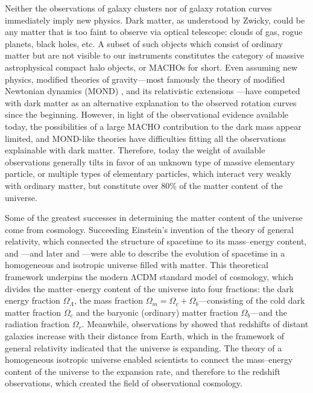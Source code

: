 \documentclass[b5paper, 10pt, twoside]{book}
\begin{document}
Neither the observations of galaxy clusters nor of galaxy rotation curves immediately imply new physics. Dark matter, as understood by Zwicky, could be any matter that is too faint to observe via optical telescope: clouds of gas, rogue planets, black holes, etc. A subset of such objects which consist of ordinary matter but are not visible to our instruments constitutes the category of massive astrophysical compact halo objects, or MACHOs for short. Even assuming new physics, modified theories of gravity---most famously the theory of modified Newtonian dynamics (MOND) \parencite{Milgrom1983}, and its relativistic extensions \parencites{Bekenstein2004, Milgrom2009, SkordisZlosnik2021}---have competed with dark matter as an alternative explanation to the observed rotation curves since the beginning. However, in light of the observational evidence available today, the possibilities of a large MACHO contribution to the dark mass appear limited, and MOND-like theories have difficulties fitting all the observations explainable with dark matter. Therefore, today the weight of available observations generally tilts in favor of an unknown type of massive elementary particle, or multiple types of elementary particles, which interact very weakly with ordinary matter, but constitute over 80\% of the matter content of the universe.

Some of the greatest successes in determining the matter content of the universe come from cosmology. Succeeding Einstein's invention of the theory of general relativity, which connected the structure of spacetime to its mass--energy content, \textcites{Friedmann1922, Friedmann1924} and \textcite{Lemaitre1927}---and later \textcites{Robertson1935, Robertson1936a, Robertson1936b} and \textcite{Walker1937}---were able to describe the evolution of spacetime in a homogeneous and isotropic universe filled with matter. This theoretical framework underpins the modern ΛCDM standard model of cosmology, which divides the matter--energy content of the universe into four fractions: the dark energy fraction $\Omega_\Lambda$, the mass fraction $\Omega_m=\Omega_c+\Omega_b$---consisting of the cold dark matter fraction $\Omega_c$ and the baryonic (ordinary) matter fraction $\Omega_b$---and the radiation fraction $\Omega_r$. Meanwhile, observations by \textcites{Slipher1917, Wirtz1922, Wirtz1924, Hubble1929} showed that redshifts of distant galaxies increase with their distance from Earth, which in the framework of general relativity indicated that the universe is expanding. The theory of a homogeneous isotropic universe enabled scientists to connect the mass--energy content of the universe to the expansion rate, and therefore to the redshift observations, which created the field of observational cosmology.
\end{document}
